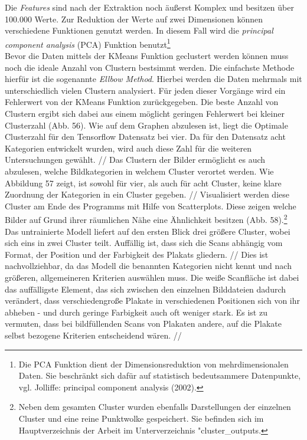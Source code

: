 \documentclass[a4paper,12pt,ngerman]{article}
\begin{document}
Die \textit{Features} sind nach der Extraktion noch äußerst Komplex und besitzen über 100.000 Werte. Zur Reduktion der Werte auf zwei Dimensionen können verschiedene Funktionen genutzt werden. In diesem Fall wird die \textit{principal component analysis} (PCA) Funktion benutzt\footnote{Die PCA Funktion dient der Dimensionsreduktion von mehrdimensionalen Daten. Sie beschränkt sich dafür auf statistisch bedeutsammere Datenpunkte, vgl. Jolliffe: principal component analysis (2002).} \\
Bevor die Daten mittels der KMeans Funktion geclustert werden können muss noch die ideale Anzahl von Clustern bestsimmt werden. Die einfachste Methode hierfür ist die sogenannte \textit{Ellbow Method}. Hierbei werden die Daten mehrmals mit unterschiedlich vielen Clustern analysiert. Für jeden dieser Vorgänge wird ein Fehlerwert von der KMeans Funktion zurückgegeben. Die beste Anzahl von Clustern ergibt sich dabei aus einem möglicht geringen Fehlerwert bei kleiner Clusterzahl (Abb. 56). Wie auf dem Graphen abzulesen ist, liegt die Optimale Clusterzahl für den Tensorflow Datensatz bei vier. Da für den Datensatz acht Kategorien entwickelt wurden, wird auch diese Zahl für die weiteren Untersuchungen gewählt. //
Das Clustern der Bilder ermöglicht es auch abzulesen, welche Bildkategorien in welchem Cluster verortet werden. Wie Abbildung 57 zeigt, ist sowohl für vier, als auch für acht Cluster, keine klare Zuordnung der Kategorien in ein Cluster gegeben. //
Visualisiert werden diese Cluster am Ende des Programms mit Hilfe von Scatterplots. Diese zeigen welche Bilder auf Grund ihrer räumlichen Nähe eine Ähnlichkeit besitzen (Abb. 58).\footnote{Neben dem gesamten Cluster wurden ebenfalls Darstellungen der einzelnen Cluster und eine reine Punktwolke gespeichert. Sie befinden sich im Hauptverzeichnis der Arbeit im Unterverzeichnis "cluster\_outputs.} Das untrainierte Modell liefert auf den ersten Blick drei größere Cluster, wobei sich eins in zwei Cluster teilt. Auffällig ist, dass sich die Scans abhängig vom Format, der Position und der Farbigkeit des Plakats gliedern. //
Dies ist nachvollziehbar, da das Modell die benannten Kategorien nicht kennt und nach größeren, allgemeineren Kriterien auswählen muss. Die weiße Scanfläche ist dabei das auffälligste Element, das sich zwischen den einzelnen Bilddateien dadurch verändert, dass verschiedengroße Plakate in verschiedenen Positionen sich von ihr abheben - und durch geringe Farbigkeit auch oft weniger stark. Es ist zu vermuten, dass bei bildfüllenden Scans von Plakaten andere, auf die Plakate selbst bezogene Kriterien entscheidend wären. //
\end{document}
